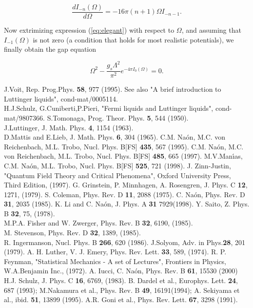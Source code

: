 \documentclass[a4paper,a4paper]{article}
\begin{document}
\begin{equation}
\frac{dI_{-n}(\Omega)}{d\Omega}=-16\pi(n+1)\Omega I_{-n-1}.
\end{equation}

\noindent Now extrimizing expression (\ref{eq:elegant}) with respect to $\Omega$, and
assuming that $I_{-1}(\Omega)$ is not zero (a condition that holds for most realistic
potentials), we finally obtain the gap equation

\begin{equation}\label{eq:omegaeq}
\Omega^2-\frac{g_s\Lambda^2}{\pi^2} e^{-4\pi I_0(\Omega)}=0.
\end{equation}

\newpage
\begin{thebibliography}{99}
 J.Voit, Rep. Prog.Phys. {\bf58}, 977 (1995). See also "A brief
introduction to Luttinger liquids", cond-mat/0005114.\\ H.J.Schulz,
G.Cuniberti,P.Pieri, "Fermi liquids and Luttinger liquids", cond-mat/9807366.
 S.Tomonaga, Prog. Theor. Phys. {\bf5}, 544 (1950).\\
 J.Luttinger, J. Math. Phys. {\bf4}, 1154 (1963).\\
 D.Mattis and E.Lieb, J. Math. Phys. {\bf6}, 304 (1965).
 C.M. Na\'on, M.C. von Reichenbach, M.L. Trobo, Nucl. Phys.
B[FS] {\bf435}, 567 (1995).
C.M. Na\'on, M.C. von Reichenbach, M.L. Trobo, Nucl. Phys.
B[FS] {\bf485}, 665 (1997).
 M.V.Man\'{\i}as, C.M. Na\'on, M.L. Trobo, Nucl. Phys.
B[FS] {\bf525}, 721 (1998).
 J. Zinn-Justin, "Quantum Field Theory and Critical Phenomena",
Oxford University Press, Third Edition, (1997).
 G. Grinstein, P. Minnhagen, A. Rosengren, J. Phys. C {\bf 12}, 1271,
(1979).
 S. Coleman, Phys. Rev. D {\bf11}, 2088 (1975).
 C. Na\'on, Phys. Rev. D {\bf31}, 2035
(1985).
 K. Li and C. Na\'on, J. Phys. A {\bf 31} 7929(1998).
 Y. Saito, Z. Phys. B {\bf 32}, 75, (1978).\\ M.P.A. Fisher and W. Zwerger,
Phys. Rev. B {\bf 32}, 6190, (1985).\\ M. Stevenson, Phys. Rev. D {\bf 32}, 1389,
(1985).\\ R. Ingermanson, Nucl. Phys. B {\bf 266}, 620 (1986).
 J.Solyom, Adv. in Phys.{\bf28}, 201 (1979).
 A. H. Luther, V. J. Emery, Phys. Rev. Lett. {\bf 33}, 589,
(1974).
 R. P. Feynman, "Statistical Mechanics - A set of Lectures",
Frontiers in Physics, W.A.Benjamin Inc., (1972).
 A. Iucci, C. Na\'on, Phys. Rev. B {\bf 61}, 15530 (2000)
 H.J. Schulz, J. Phys. C {\bf 16}, 6769, (1983).
 B. Dardel et al., Europhys. Lett. {\bf 24},
687 (1993); M.Nakamura et al., Phys. Rev. B {\bf 49}, 16191(1994); A. Sekiyama et al.,
ibid. {\bf 51}, 13899 (1995).
 A.R. Goni et al., Phys. Rev. Lett. {\bf67},
3298 (1991).


\end{thebibliography}
\end{document}
